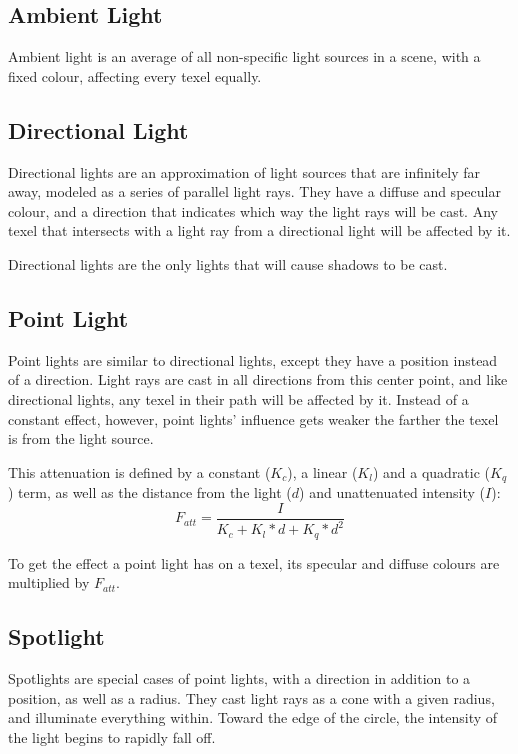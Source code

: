 \documentclass[11pt, oneside]{report}
\begin{document}
\subsection{Ambient Light}
Ambient light is an average of all non-specific light sources in a scene, with a fixed colour, affecting every \gls{texel} equally.

\subsection{Directional Light}
Directional lights are an approximation of light sources that are infinitely far away, modeled as a series of parallel light rays. They have a diffuse and specular colour, and a direction that indicates which way the light rays will be cast. Any \gls{texel} that intersects with a light ray from a directional light will be affected by it.

Directional lights are the only lights that will cause shadows to be cast.

\subsection{Point Light}
Point lights are similar to directional lights, except they have a position instead of a direction. Light rays are cast in all directions from this center point, and like directional lights, any \gls{texel} in their path will be affected by it. Instead of a constant effect, however, point lights' influence gets weaker the farther the \gls{texel} is from the light source.

This attenuation is defined by a constant ($K_c$), a linear ($K_l$) and a quadratic ($K_q$) term, as well as the distance from the light ($d$) and unattenuated intensity ($I$): \begin{equation} F_{att} = \frac{I}{K_c + K_l * d + K_q * d^2} \end{equation}

To get the effect a point light has on a \gls{texel}, its specular and diffuse colours are multiplied by $F_{att}$.

\subsection{Spotlight}
Spotlights are special cases of point lights, with a direction in addition to a position, as well as a radius. They cast light rays as a cone with a given radius, and illuminate everything within. Toward the edge of the circle, the intensity of the light begins to rapidly fall off.
\end{document}
